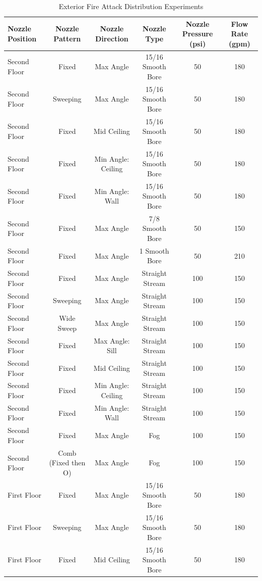 \documentclass{article}
\begin{document}
\clearpage

\begin{table}[]
\centering
\scriptsize
\caption{Exterior Fire Attack Distribution Experiments}
\label{Exterior_Fire_Attack_Distribution_Experiments}
\begin{tabular}{lccccc}
\toprule[1.5pt]
{\textbf{Nozzle Position}} & {\textbf{Nozzle Pattern}} & {\textbf{Nozzle Direction}} & {\textbf{Nozzle Type}} & {\textbf{Nozzle Pressure (psi)}} & \textbf{Flow Rate (gpm)} \\ 
\midrule
Second Floor & Fixed & Max Angle & 15/16 Smooth Bore & 50 & 180 \\
Second Floor & Sweeping & Max Angle & 15/16 Smooth Bore & 50 & 180 \\
Second Floor & Fixed & Mid Ceiling & 15/16 Smooth Bore & 50 & 180 \\
Second Floor & Fixed & Min Angle: Ceiling & 15/16 Smooth Bore & 50 & 180 \\
Second Floor & Fixed & Min Angle: Wall & 15/16 Smooth Bore & 50 & 180 \\
Second Floor & Fixed & Max Angle & 7/8 Smooth Bore & 50 & 150 \\
Second Floor & Fixed & Max Angle & 1 Smooth Bore & 50 & 210 \\
Second Floor & Fixed & Max Angle & Straight Stream & 100 & 150 \\
Second Floor & Sweeping & Max Angle & Straight Stream & 100 & 150 \\
Second Floor & Wide Sweep & Max Angle & Straight Stream & 100 & 150 \\
Second Floor & Fixed & Max Angle: Sill & Straight Stream & 100 & 150 \\
Second Floor & Fixed & Mid Ceiling & Straight Stream & 100 & 150 \\
Second Floor & Fixed & Min Angle: Ceiling & Straight Stream & 100 & 150 \\
Second Floor & Fixed & Min Angle: Wall & Straight Stream & 100 & 150 \\
Second Floor & Fixed & Max Angle & Fog & 100 & 150 \\
Second Floor & Comb (Fixed then O) & Max Angle & Fog & 100 & 150 \\
First Floor & Fixed & Max Angle & 15/16 Smooth Bore & 50 & 180 \\
First Floor & Sweeping & Max Angle & 15/16 Smooth Bore & 50 & 180 \\
First Floor & Fixed & Mid Ceiling & 15/16 Smooth Bore & 50 & 180 \\

\end{tabular}
\end{table}
\end{document}
